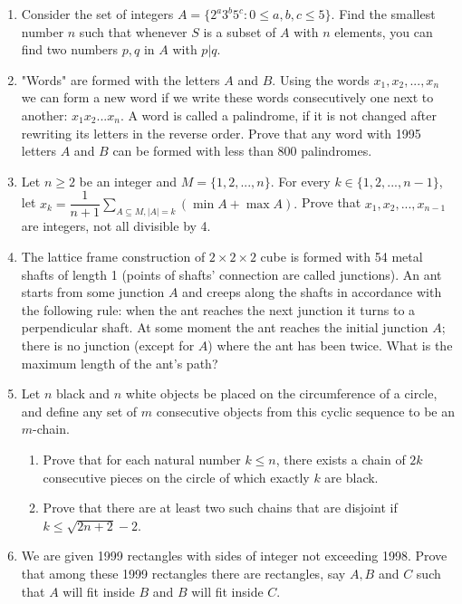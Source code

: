 \documentclass[12pt]{scrartcl}
\begin{document}
\begin{enumerate}[resume]
    \item Consider the set of integers $A=\{2^{a}3^{b}5^{c}:0\le a,b,c\le5\}$. Find the smallest number $n$ such that whenever $S$ is a subset of $A$ with $n$ elements, you can find two numbers $p, q$ in $A$ with $p|q$.

    \item "Words" are formed with the letters $A$ and $B$. Using the words $x_{1},x_{2},...,x_{n}$ we can form a new word if we write these words consecutively one next to another: $x_{1}x_{2}...x_{n}$. A word is called a palindrome, if it is not changed after rewriting its letters in the reverse order. Prove that any word with 1995 letters $A$ and $B$ can be formed with less than 800 palindromes.

    \item Let $n\ge2$ be an integer and $M=\{1,2,...,n\}$. For every $k\in\{1,2,...,n-1\}$, let $x_{k}=\dfrac{1}{n+1}\displaystyle\sum_{A \subseteq M,|A|=k}(\min A+\max A).$ Prove that $x_{1},x_{2},...,x_{n-1}$ are integers, not all divisible by 4.


    \item The lattice frame construction of $2\times2\times2$ cube is formed with 54 metal shafts of length 1 (points of shafts' connection are called junctions). An ant starts from some junction $A$ and creeps along the shafts in accordance with the following rule: when the ant reaches the next junction it turns to a perpendicular shaft. At some moment the ant reaches the initial junction $A$; there is no junction (except for $A$) where the ant has been twice. What is the maximum length of the ant's path?

    \item Let $n$ black and $n$ white objects be placed on the circumference of a circle, and define any set of $m$ consecutive objects from this cyclic sequence to be an $m$-chain.
    \begin{enumerate}
        \item[(a)] Prove that for each natural number $k\le n$, there exists a chain of $2k$ consecutive pieces on the circle of which exactly $k$ are black.
        \item[(b)] Prove that there are at least two such chains that are disjoint if $k\le\sqrt{2n+2}-2$.
    \end{enumerate}

    \item We are given 1999 rectangles with sides of integer not exceeding 1998. Prove that among these 1999 rectangles there are rectangles, say $A, B$ and $C$ such that $A$ will fit inside $B$ and $B$ will fit inside $C$.


\end{enumerate}
\end{document}
